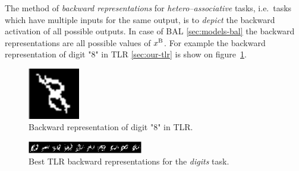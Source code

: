 \label{sec:our-backward-repre}

The method of \emph{backward representations} for \emph{hetero--associative} tasks, i.e.~tasks which have multiple inputs for the same output, is to \emph{depict} the backward activation of all possible outputs. In case of BAL \ref{sec:models-bal} the backward representations are all possible values of $x^{\rm B}$. For example the backward representation of digit "8" in TLR \ref{sec:our-tlr} is show on figure~\ref{fig:our-backward-repre}. 

\begin{figure}[H]
  \centering
  \includegraphics[width=0.2\textwidth]{img/tlr-digit-8.png} %
  \caption{Backward representation of digit "8" in TLR.}
  \label{fig:our-backward-repre}
\end{figure}

\begin{figure}[H]
  \centering
  \includegraphics[width=0.45\textwidth]{img/tlr-digits.png}    
  \caption{Best TLR backward representations for the \emph{digits} task.}
  \label{fig:results-tlr-digits-backward} 
\end{figure}
